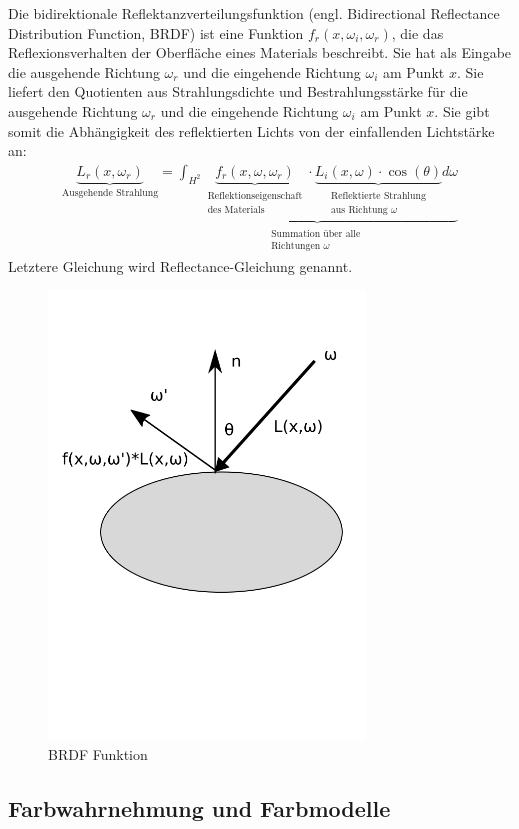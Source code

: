 \begin{Definition}
Die  bidirektionale Reflektanzverteilungsfunktion (engl. Bidirectional Reflectance Distribution Function, BRDF)
ist eine Funktion $f_r (x, \omega_i, \omega_r)$, die das Reflexionsverhalten der Oberfläche eines Materials beschreibt. 
Sie hat als Eingabe die ausgehende Richtung $\omega_r$ und die eingehende Richtung  $\omega_i$ am Punkt $x$. 
Sie  liefert den Quotienten aus Strahlungsdichte und Bestrahlungsstärke für die ausgehende Richtung $\omega_r$ und die eingehende Richtung  $\omega_i$ am Punkt $x$.
Sie gibt somit die Abhängigkeit des reflektierten Lichts von der einfallenden Lichtstärke an: 
\begin{align}
\underbrace{L_r(x, \omega_r)}_{\text{Ausgehende Strahlung}} =\underbrace{\int_{H^2} \underbrace{f_r (x, \omega, \omega_r)}_{\substack{\text{Reflektionseigenschaft} \\ \text{des Materials}}} \cdot  \underbrace{L_i(x, \omega) \cdot  \cos(\theta) }_{\substack{\text{Reflektierte Strahlung} \\ \text{aus Richtung $\omega$}}} d\omega}_{\substack{\text{Summation über alle } \\ \text{Richtungen $\omega$}}} 
\end{align}
Letztere Gleichung wird  Reflectance-Gleichung genannt.
\end{Definition}
 \begin{figure}[H]
    \centering
    \includegraphics[width=0.75\textwidth]{images/brdf.png}
    \caption{BRDF Funktion}
    \label{fig:raytracin_brdf}
\end{figure}




\subsection{Farbwahrnehmung und Farbmodelle}
